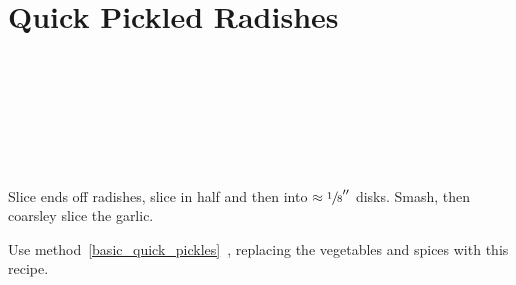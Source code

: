 \section[Pickled Radishes]{Quick Pickled Radishes}\label{pickled_radishes}

\begin{ingredientcolumns}[1]
    \begin{ingredientblock}
        \\
        \\
        \\
        \\
        \\
        \\
    \end{ingredientblock}
\end{ingredientcolumns}

\begin{preparation}
\item Slice ends off radishes, slice in half and then into $\approx \sfrac{1}{8}''$ disks.
    Smash, then coarsley slice the garlic.

\item Use method~\ref{basic_quick_pickles}~, replacing the vegetables and spices
    with this recipe.
\end{preparation}

\recipeend%
